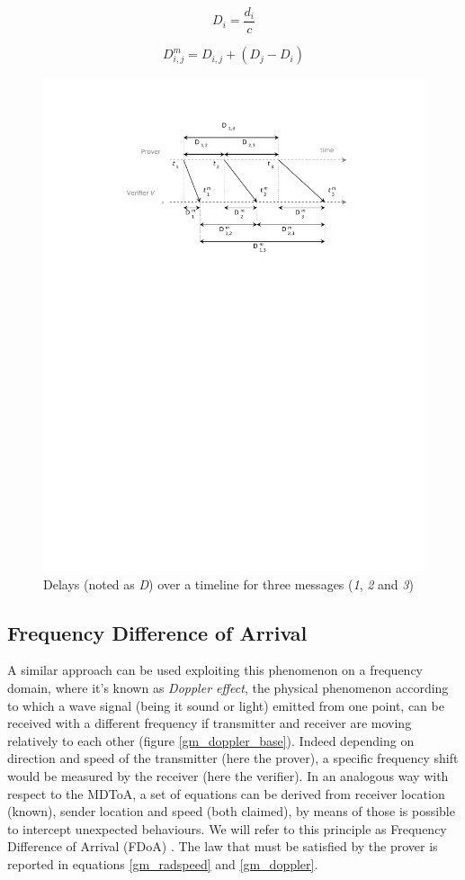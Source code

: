 \begin{equation}
    D_i = \frac{d_i}{c}
    \label{gm_delay}
\end{equation}

\begin{equation}
    D_{i,j}^m = D_{i,j} + (D_j - D_i)
    \label{gm_delay_trust}
\end{equation}

\begin{figure}
    \includegraphics[width=.47\textwidth,trim={46mm 177mm 40mm 20mm},clip]{gm_delay_pic}
    \caption{Delays (noted as \textit{D}) over a timeline for three messages (\textit{1}, \textit{2} and \textit{3}) \cite{schaefer15}}
    \label{gm_delay_pic}
\end{figure}

\subsection{Frequency Difference of Arrival} \label{gm_sec_fdoa}

A similar approach can be used exploiting this phenomenon on a frequency domain, where it's known as \textit{Doppler effect}, the physical phenomenon according to which a wave signal (being it sound or light) emitted from one point, can be received with a different frequency if transmitter and receiver are moving relatively to each other (figure \ref{gm_doppler_base}). Indeed depending on direction and speed of the transmitter (here the prover), a specific frequency shift would be measured by the receiver (here the verifier). In an analogous way with respect to the MDToA, a set of equations can be derived from receiver location (known), sender location and speed (both claimed), by means of those is possible to intercept unexpected behaviours. We will refer to this principle as Frequency Difference of Arrival (FDoA) \cite{schaefer16} \cite{ghose15}. The law that must be satisfied by the prover is reported in equations \eqref{gm_radspeed} and \eqref{gm_doppler}.

